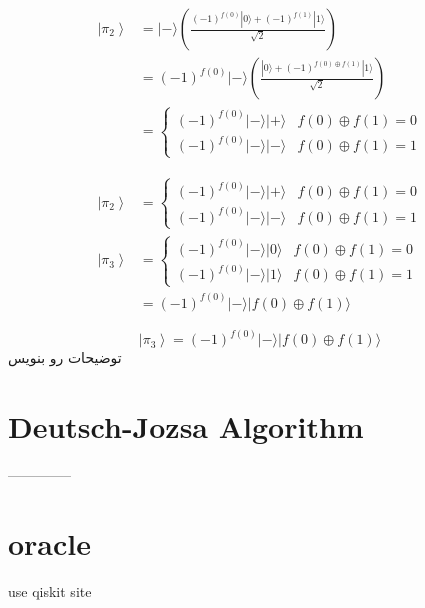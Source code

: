 \documentclass{book}
\begin{document}
$$
\begin{aligned}
	\left|\pi_2\right\rangle & =|-\rangle\left(\frac{(-1)^{f(0)}|0\rangle+(-1)^{f(1)}|1\rangle}{\sqrt{2}}\right) \\
	& =(-1)^{f(0)}|-\rangle\left(\frac{|0\rangle+(-1)^{f(0) \oplus f(1)}|1\rangle}{\sqrt{2}}\right) \\
	& = \begin{cases}(-1)^{f(0)}|-\rangle|+\rangle & f(0) \oplus f(1)=0 \\
		(-1)^{f(0)}|-\rangle|-\rangle & f(0) \oplus f(1)=1\end{cases}
\end{aligned}
$$


$$
\begin{aligned}
	\left|\pi_2\right\rangle & = \begin{cases}(-1)^{f(0)}|-\rangle|+\rangle & f(0) \oplus f(1)=0 \\
		(-1)^{f(0)}|-\rangle|-\rangle & f(0) \oplus f(1)=1\end{cases} \\
	\left|\pi_3\right\rangle & = \begin{cases}(-1)^{f(0)}|-\rangle|0\rangle & f(0) \oplus f(1)=0 \\
		(-1)^{f(0)}|-\rangle|1\rangle & f(0) \oplus f(1)=1\end{cases} \\
	& =(-1)^{f(0)}|-\rangle|f(0) \oplus f(1)\rangle
\end{aligned}
$$

$$
\left|\pi_3\right\rangle=(-1)^{f(0)}|-\rangle|f(0) \oplus f(1)\rangle
$$
توضیحات رو بنویس



\newpage

\section{Deutsch-Jozsa Algorithm}




--------------	
	
	
	
	
\section{oracle}
use qiskit site
\end{document}
